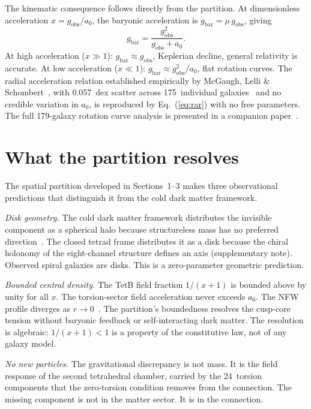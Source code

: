 \documentclass[twocolumn]{iopjournal}
\begin{document}
The kinematic consequence follows directly from the partition.
At dimensionless acceleration $x = g_{\mathrm{obs}}/a_0$, the
baryonic acceleration is
$g_{\mathrm{bar}} = \mu\,g_{\mathrm{obs}}$, giving
\begin{equation}
  g_{\mathrm{bar}} =
  \frac{g_{\mathrm{obs}}^2}{g_{\mathrm{obs}} + a_0}.
  \label{eq:rar}
\end{equation}
At high acceleration ($x \gg 1$):
$g_{\mathrm{bar}} \approx g_{\mathrm{obs}}$, Keplerian
decline, general relativity is accurate.  At low acceleration
($x \ll 1$):
$g_{\mathrm{bar}} \approx g_{\mathrm{obs}}^2/a_0$, flat
rotation curves.  The radial acceleration relation established
empirically by McGaugh, Lelli \&
Schombert~\cite{McGaugh2016}, with 0.057~dex scatter across
175~individual galaxies~\cite{Li2018} and no credible
variation in $a_0$, is reproduced by Eq.~(\ref{eq:rar}) with
no free parameters.  The full 179-galaxy rotation curve
analysis is presented in a companion
paper~\cite{Nelson2026c}.


\section{What the partition resolves}

The spatial partition developed in Sections~1--3 makes three
observational predictions that distinguish it from the cold
dark matter framework.

\textit{Disk geometry.}  The cold dark matter framework
distributes the invisible component as a spherical halo
because structureless mass has no preferred
direction~\cite{NFW1996}.  The closed tetrad frame distributes
it as a disk because the chiral holonomy of the eight-channel
structure defines an axis (supplementary note).  Observed
spiral galaxies are disks.  This is a zero-parameter geometric
prediction.

\textit{Bounded central density.}  The TetB field fraction
$1/(x{+}1)$ is bounded above by unity for all $x$.  The
torsion-sector field acceleration never exceeds $a_0$.  The NFW
profile diverges as $r \to 0$~\cite{NFW1996}.  The partition's
boundedness resolves the cusp-core tension without baryonic
feedback or self-interacting dark matter.  The resolution is
algebraic: $1/(x{+}1) < 1$ is a property of the constitutive
law, not of any galaxy model.

\textit{No new particles.}  The gravitational discrepancy is
not mass.  It is the field response of the second tetrahedral
chamber, carried by the 24~torsion components that the
zero-torsion condition removes from the connection.  The
missing component is not in the matter sector.  It is in the
connection.
\end{document}
